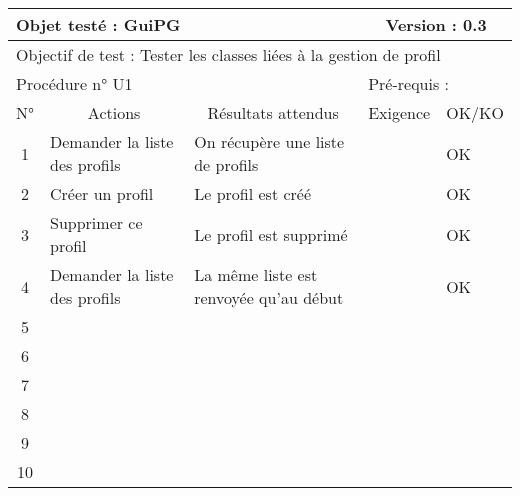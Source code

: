 \documentclass{../res/univ-projet}
\begin{document}
\begin{center}



    \begin{tabular}{|c|p{5cm}|p{5cm}|p{1.5cm}|p{1.5cm}|}
      \hline
      \multicolumn{3}{|l|}{Objet testé : GuiPG} & \multicolumn{2}{c|}{Version : 0.3}\\ \hline
      \multicolumn{5}{|l|}{Objectif de test : Tester les classes liées à la gestion de profil}\\ \hline
      \multicolumn{3}{|l|}{Procédure n° U1} & \multicolumn{2}{p{3cm}|}{Pré-requis : }\\ \hline
      \multicolumn{1}{|c|}{N°} & \multicolumn{1}{c|}{Actions} & \multicolumn{1}{c|}{Résultats attendus} & 
      \multicolumn{1}{c|}{Exigence} & \multicolumn{1}{c|}{OK/KO}\\ \hline
      1 & Demander la liste des profils & On récupère une liste de profils &  & OK \\
      2 & Créer un profil & Le profil est créé &  & OK \\
      3 & Supprimer ce profil & Le profil est supprimé &  & OK \\ 
      4 & Demander la liste des profils & La même liste est renvoyée qu'au début &  & OK \\
      5 &  &  &  & \\
      6 &  &  &  & \\
      7 &  &  &  & \\
      8 &  &  &  & \\
      9 &  &  &  & \\
      10 &  &  &  &\\ 
  \hline
    \end{tabular}
    \vskip 2.2cm



\end{center}
\end{document}
